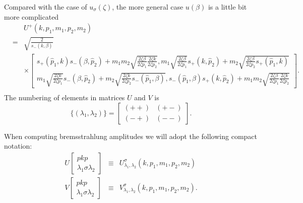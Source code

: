 Compared with the case of $u_\sigma(\zeta)$, the more general case $u(\beta)$ is a little bit more complicated
\begin{eqnarray}
&&U^+(k,p_1,m_1,p_2,m_2)\nonumber\\
&=&\sqrt{\frac{2}{s_-(k,\beta)}}\nonumber\\
&&\times\left[\begin{array}{cc}
s_+(\hat{p}_1,k)s_-(\beta,\hat{p}_2)+m_1m_2\sqrt{\frac{2\zeta\beta}{2\zeta p_1}\frac{2\zeta k}{2\zeta p_2}}, m_1\sqrt{\frac{2\zeta\beta}{2\zeta p_1}}s_+(k,\hat{p}_2)+m_2\sqrt{\frac{2\zeta\beta}{2\zeta p_2}s_+(\hat{p}_1,k)}\\
m_1\sqrt{\frac{2\zeta k}{2\zeta p_1}}s_-(\beta,\hat{p}_2)+m_2\sqrt{\frac{2\zeta k}{2\zeta p_2}s_-(\hat{p}_1,\beta)}, s_-(\hat{p}_1,\beta)s_+(k,\hat{p}_2)+m_1m_2\sqrt{\frac{2\zeta\beta}{2\zeta p_1}\frac{2\zeta k}{2\zeta p_2}}
\end{array}\right].\nonumber\\
\end{eqnarray} 
The numbering of elements in matrices $U$ and $V$ is
\begin{equation}
\{(\lambda_1,\lambda_2)\}=\left[\begin{array}{cc}
(++)&(+-)\\
(-+)&(--)
\end{array}\right].
\end{equation}

When computing bremsstrahlung amplitudes we will adopt the following compact notation:
\begin{eqnarray}
U\left[\begin{array}{c}
pkp\\\lambda_1\sigma\lambda_2
\end{array}\right]&\equiv&U^\sigma_{\lambda_1,\lambda_2}(k,p_1,m_1,p_2,m_2)\nonumber\\
V\left[\begin{array}{c}
pkp\\\lambda_1\sigma\lambda_2
\end{array}\right]&\equiv&V^\sigma_{\lambda_1,\lambda_2}(k,p_1,m_1,p_2,m_2).
\end{eqnarray}

